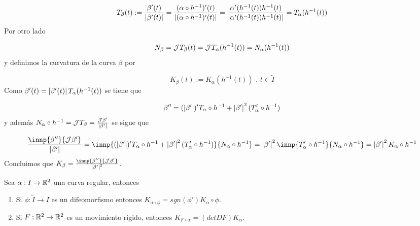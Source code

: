 \documentclass{article}
\begin{document}
\begin{equation*}
    T_{\beta}(t):=\frac{\beta'(t)}{\left|\beta'(t) \right|}=
    \frac{(\alpha\circ h^{-1})'(t)}{\left|(\alpha\circ h^{-1})'(t) \right|}=
    \frac{\alpha'(h^{-1}(t))h^{-1}(t)}{\left|\alpha'(h^{-1}(t))h^{-1}(t) \right|}=
    T_{\alpha}(h^{-1}(t))
\end{equation*}
Por otro lado

\begin{equation*}
    N_{\beta}=\mathcal{J} T_{\beta}(t)=\mathcal{J} T_{\alpha}(h^{-1}(t))=N_{\alpha}(h^{-1}(t))
\end{equation*}
y definimos la curvatura de la curva $\beta$ por

\begin{equation*}
    K_{\beta}(t):=K_{\alpha}(h^{-1}(t))\text{ , }t\in\widetilde{I}
\end{equation*}
Como $\beta'(t)=\left|\beta'(t) \right|T_{\alpha}(h^{-1}(t))$ se tiene que

\begin{equation*}
    \beta''=(\left|\beta' \right|)'T_{\alpha}\circ h^{-1}+\left|\beta' \right|^{2}(T'_{\alpha}\circ h^{-1})
\end{equation*}
y además $N_{\alpha}\circ h^{-1}=\mathcal{J} T_{\beta}=\frac{\mathcal{J}\beta'}{\left|\beta' \right|}$ se sigue que

\begin{equation*}
    \frac{\innp{\beta''}{\J\beta'}}{\abs{\beta'}}=
    \innp{(\abs{\beta'})'T_{\alpha}\circ h^{-1}+\abs{\beta'}^{2}(T'_{\alpha}\circ h^{-1})}
    {N_{\alpha}\circ h^{-1}}=\abs{\beta'}^{2}\innp{T'_{\alpha}\circ h^{-1}}{N_{\alpha}\circ h^{-1}}
    =\abs{\beta'}^{2}K_{\alpha}\circ h^{-1}
\end{equation*}
Concluimos que $K_{\beta}=\frac{\innp{\beta''}{\J\beta'}}{\abs{\beta'}^{3}}$.

\begin{prop}
    Sea $\alpha: I\to\mathbb{R}^{2}$ una curva regular, entonces
    \begin{enumerate}
        \item Si $\phi:\widetilde{I}\to I$ es un difeomorfismo entonces $K_{\alpha\circ\phi}=
        sgn(\phi')K_{\alpha}\circ\phi$.
        
        \item Si $F:\mathbb{R}^{2}\to\mathbb{R}^{2}$ es un movimiento rigido, entonces $K_{F\circ\alpha}=
        (detDF)K_{\alpha}$.
    \end{enumerate}
\end{prop}
\end{document}
